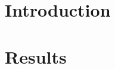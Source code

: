\documentclass[5p,numafflabel]{elsarticle}
\newcommand{\co}{\ce{CO2}~}
\def\co{CO${}_2${\:}}
\begin{document}





% 


\onecolumn

\linenumbers


\section*{Introduction}
\label{sec:intro}




% 



\section*{Results}
\label{sec:results}
\end{document}
